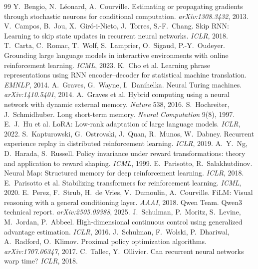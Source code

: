 \documentclass[11pt,a4paper]{article}
\begin{document}
\begin{thebibliography}{99}\small
{} Y.~Bengio, N.~L\'eonard, A.~Courville. Estimating or propagating gradients through stochastic neurons for conditional computation. \emph{arXiv:1308.3432}, 2013.
 V.~Campos, B.~Jou, X.~Gir\'o-i-Nieto, J.~Torres, S.-F.~Chang. Skip RNN: Learning to skip state updates in recurrent neural networks. \emph{ICLR}, 2018.
 T.~Carta, C.~Romac, T.~Wolf, S.~Lamprier, O.~Sigaud, P.-Y.~Oudeyer. Grounding large language models in interactive environments with online reinforcement learning. \emph{ICML}, 2023.
 K.~Cho et al. Learning phrase representations using RNN encoder--decoder for statistical machine translation. \emph{EMNLP}, 2014.
 A.~Graves, G.~Wayne, I.~Danihelka. Neural Turing machines. \emph{arXiv:1410.5401}, 2014.
 A.~Graves et al. Hybrid computing using a neural network with dynamic external memory. \emph{Nature} 538, 2016.
 S.~Hochreiter, J.~Schmidhuber. Long short-term memory. \emph{Neural Computation} 9(8), 1997.
 E.~J.~Hu et al. LoRA: Low-rank adaptation of large language models. \emph{ICLR}, 2022.
 S.~Kapturowski, G.~Ostrovski, J.~Quan, R.~Munos, W.~Dabney. Recurrent experience replay in distributed reinforcement learning. \emph{ICLR}, 2019.
 A.~Y.~Ng, D.~Harada, S.~Russell. Policy invariance under reward transformations: theory and application to reward shaping. \emph{ICML}, 1999.
 E.~Parisotto, R.~Salakhutdinov. Neural Map: Structured memory for deep reinforcement learning. \emph{ICLR}, 2018.
 E.~Parisotto et al. Stabilizing transformers for reinforcement learning. \emph{ICML}, 2020.
 E.~Perez, F.~Strub, H.~de Vries, V.~Dumoulin, A.~Courville. FiLM: Visual reasoning with a general conditioning layer. \emph{AAAI}, 2018.
 Qwen Team. Qwen3 technical report. \emph{arXiv:2505.09388}, 2025.
 J.~Schulman, P.~Moritz, S.~Levine, M.~Jordan, P.~Abbeel. High-dimensional continuous control using generalized advantage estimation. \emph{ICLR}, 2016.
 J.~Schulman, F.~Wolski, P.~Dhariwal, A.~Radford, O.~Klimov. Proximal policy optimization algorithms. \emph{arXiv:1707.06347}, 2017.
 C.~Tallec, Y.~Ollivier. Can recurrent neural networks warp time? \emph{ICLR}, 2018.
\end{thebibliography}
\end{document}
